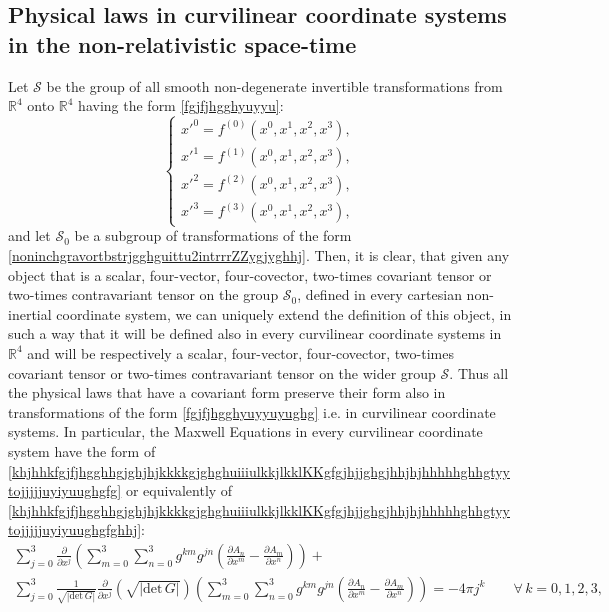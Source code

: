 \documentclass{article}
\theoremstyle{definition}
\theoremstyle{remark}
\newcommand{\er}{\eqref}
\newcommand{\er}{\eqref}
\begin{document}
\subsection{Physical laws in curvilinear coordinate systems in the
non-relativistic space-time}
Let $\mathcal{S}$ be the group of all smooth non-degenerate
invertible transformations from $\mathbb{R}^4$ onto $\mathbb{R}^4$
having the form \er{fgjfjhgghyuyyu}:
\begin{equation}\label{fgjfjhgghyuyyuyughg}
\begin{cases}
x'^0=f^{(0)}(x^0,x^1,x^2,x^3),\\
x'^1=f^{(1)}(x^0,x^1,x^2,x^3),\\
x'^2=f^{(2)}(x^0,x^1,x^2,x^3),\\
x'^3=f^{(3)}(x^0,x^1,x^2,x^3),
\end{cases}
\end{equation}
and let $\mathcal{S}_0$ be a subgroup of transformations of the form
\er{noninchgravortbstrjgghguittu2intrrrZZygjyghhj}. Then, it is
clear, that given any object that is a scalar, four-vector,
four-covector, two-times covariant tensor or two-times contravariant
tensor on the group $\mathcal{S}_0$, defined in every cartesian
non-inertial coordinate system, we can uniquely extend the
definition of this object, in such a way that it will be defined
also in every curvilinear coordinate systems in $\mathbb{R}^4$ and
will be respectively a scalar, four-vector, four-covector, two-times
covariant tensor or two-times contravariant tensor on the wider
group $\mathcal{S}$. Thus all the physical laws that have a
covariant form preserve their form also in transformations of the
form \er{fgjfjhgghyuyyuyughg} i.e. in curvilinear coordinate
systems. In particular, the Maxwell Equations in every curvilinear
coordinate system have the form of
\er{khjhhkfgjfjhgghhgjghjhjkkkkgjghghuiiiulkkjlkklKKgfgjhjjghgjhhjhjhhhhhghhgtyytojjjjjuyiyuughgfg}
or equivalently of
\er{khjhhkfgjfjhgghhgjghjhjkkkkgjghghuiiiulkkjlkklKKgfgjhjjghgjhhjhjhhhhhghhgtyytojjjjjuyiyuughgfghhj}:
\begin{multline}\label{khjhhkfgjfjhgghhgjghjhjkkkkgjghghuiiiulkkjlkklKKgfgjhjjghgjhhjhjhhhhhghhgtyytojjjjjuyiyuughgfghjjhkpk}
\sum_{j=0}^{3}\frac{\partial}{\partial
x^j}\left(\sum_{m=0}^{3}\sum_{n=0}^{3}g^{km}g^{jn}\left(\frac{\partial
A_n}{\partial x^m}-\frac{\partial A_m}{\partial
x^n}\right)\right)+\\
\sum_{j=0}^{3}\frac{1}{\sqrt{|\text{det}\,G|}}\frac{\partial}{\partial
x^j}\left(\sqrt{|\text{det}\,G|}\right)\left(\sum_{m=0}^{3}\sum_{n=0}^{3}g^{km}g^{jn}\left(\frac{\partial
A_n}{\partial x^m}-\frac{\partial A_m}{\partial x^n}\right)\right)
=-4\pi j^k\quad\quad\forall\, k=0,1,2,3,
\end{multline}
\end{document}
